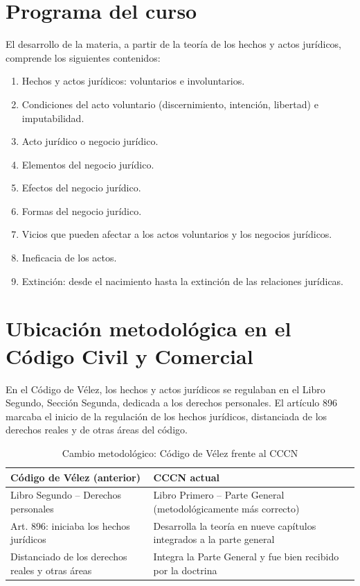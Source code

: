 \documentclass[12pt,oneside]{book}
\begin{document}
\section{Programa del curso}

El desarrollo de la materia, a partir de la teoría de los hechos y actos jurídicos, comprende los siguientes contenidos:

\begin{enumerate}
    \item Hechos y actos jurídicos: voluntarios e involuntarios.
    \item Condiciones del acto voluntario (discernimiento, intención, libertad) e imputabilidad.
    \item Acto jurídico o negocio jurídico.
    \item Elementos del negocio jurídico.
    \item Efectos del negocio jurídico.
    \item Formas del negocio jurídico.
    \item Vicios que pueden afectar a los actos voluntarios y los negocios jurídicos.
    \item Ineficacia de los actos.
    \item Extinción: desde el nacimiento hasta la extinción de las relaciones jurídicas.
\end{enumerate}

\section{Ubicación metodológica en el Código Civil y Comercial}

En el Código de Vélez, los hechos y actos jurídicos se regulaban en el Libro Segundo, Sección Segunda, dedicada a los derechos personales. El artículo 896 marcaba el inicio de la regulación de los hechos jurídicos, distanciada de los derechos reales y de otras áreas del código.

\begin{table}[H]
\centering
\caption{Cambio metodológico: Código de Vélez frente al CCCN}
\begin{tabularx}{\textwidth}{X X}
\toprule
\textbf{Código de Vélez (anterior)} & \textbf{CCCN actual} \\
\midrule
Libro Segundo -- Derechos personales & Libro Primero -- Parte General (metodológicamente más correcto) \\
Art. 896: iniciaba los hechos jurídicos & Desarrolla la teoría en nueve capítulos integrados a la parte general \\
Distanciado de los derechos reales y otras áreas & Integra la Parte General y fue bien recibido por la doctrina \\
\bottomrule
\end{tabularx}
\end{table}
\end{document}
